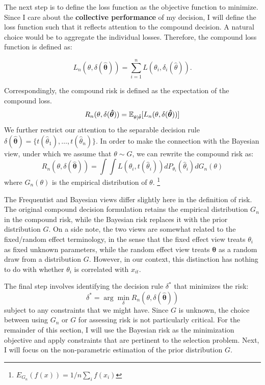 \documentclass[12pt]{article}
\begin{document}
The next step is to define the loss function as the objective function to
minimize. Since I care about the \textbf{collective performance} of my
decision, I will define the loss function such that it reflects attention to
the compound decision. A natural choice would be to aggregate the individual
losses. Therefore, the compound loss function is defined as:

\begin{equation*}
    L_n(\theta, \delta(\boldsymbol{\hat{\theta}})) = \sum_{i=1}^n L(\theta_i, \delta_i(\hat{\theta})).
\end{equation*}

Correspondingly, the compound risk is defined as the expectation of the
compound loss.
\begin{equation*}
    R_n(\theta, \delta(\boldsymbol{\hat{\theta}})) = \mathbb{E}_{\theta|\hat{\theta}}[L_n(\theta, \delta(\boldsymbol{\hat{\theta}}))]
\end{equation*}
We further restrict our attention to the separable decision rule \( \delta(\boldsymbol{\hat{\theta}}) = \{t(\hat{\theta}_1), \ldots, t(\hat{\theta}_n)\} \). In order to make the connection with the Bayesian view, under which we assume that \( \theta \sim G \), we can rewrite the compound risk as:
\begin{equation*}
    R_n(\theta, \delta(\boldsymbol{\hat{\theta}})) = \int \int L(\theta_i, t(\hat{\theta}_i))dP_{\theta_i}(\hat{\theta}_i)dG_n(\theta)
\end{equation*}
where $G_n(\theta)$ is the empirical distribution of $\theta$. \footnote{$E_{G_n}(f(x)) = 1/n \sum_i f(x_i)$}

The Frequentist and Bayesian views differ slightly here in the definition of
risk. The original compound decision formulation retains the empirical
distribution \( G_n \) in the compound risk, while the Bayesian risk replaces
it with the prior distribution \( G \). On a side note, the two views are
somewhat related to the fixed/random effect terminology, in the sense that the
fixed effect view treats \( \theta_i \) as fixed unknown parameters, while the
random effect view treats \( \boldsymbol{\theta} \) as a random draw from a
distribution \( G \). However, in our context, this distinction has nothing to
do with whether \( \theta_i \) is correlated with \( x_{it} \).

The final step involves identifying the decision rule \( \delta^* \) that
minimizes the risk:
\begin{equation}
    \delta^* = \arg \min_{\delta} R_n(\theta, \delta(\boldsymbol{\hat{\theta}}))
\end{equation}
subject to any constraints that we might have. Since \( G \) is unknown, the choice between using \( G_n \) or \( G \) for assessing risk is not particularly critical. For the remainder of this section, I will use the Bayesian risk as the minimization objective and apply constraints that are pertinent to the selection problem. Next, I will focus on the non-parametric estimation of the prior distribution \( G \).
\end{document}
